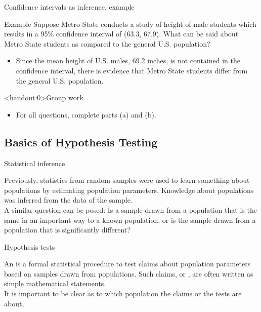 \documentclass[xcolor=table, aspectratio=169, bigger]{beamer}
\begin{document}
\begin{frame}{Confidence intervals as inference, example}
\begin{exampleblock}{Example}
Suppose Metro State conducts a study of height of male students which results in a 95\% confidence interval of (63.3, 67.9). What can be said about Metro State students as compared to the general U.S. population?
\begin{itemize}
\pause\item Since the mean height of U.S. males, 69.2 inches, is not contained in the confidence interval, there is evidence that Metro State students differ from the general U.S. population. 
\end{itemize}
\end{exampleblock}
\end{frame}

\begin{frame}<handout:0>{Group work}
\begin{block}{}
\large
\begin{itemize}
\item For all questions, complete parts (a) and (b).
\end{itemize}
\end{block}
\end{frame}

%
%
\subsection{Basics of Hypothesis Testing}

\begin{frame}{Statistical inference}
\begin{block}{}
Previously, statistics from random samples were used to learn something about populations by estimating population parameters. Knowledge about populations was inferred from the data of the sample.\\
\medskip
A similar question can be posed: Is a sample drawn from a population that is the same in an important way to a known population, or is the sample drawn from a population that is significantly different?
\end{block}

\end{frame}


\begin{frame}{Hypothesis tests}
\begin{block}{}
An  is a formal statistical procedure to test claims about population parameters based on samples drawn from populations. Such claims, or , are often written as simple mathematical statements.\\
\medskip
It is important to be clear as to which population the claims or the tests are about,
\end{block}
\end{frame}
\end{document}
